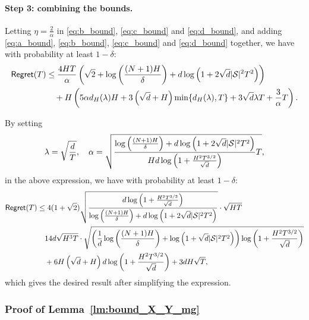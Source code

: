 \paragraph{Step 3: combining the bounds.} Letting $\eta = \frac{2}{\alpha}$ in \eqref{eq:b_bound}, \eqref{eq:c_bound} and \eqref{eq:d_bound}, and adding \eqref{eq:a_bound}, \eqref{eq:b_bound}, \eqref{eq:c_bound} and \eqref{eq:d_bound} together, we have with probability at least $1-\delta$:
\begin{align*}
    \mathsf{Regret}(T)&\leq \frac{4HT}{\alpha}\left(\sqrt{2} + \log\left(\frac{(N+1)H}{\delta}\right) + d\log\left(1+2\sqrt{d}|{\mathcal{S}}|^2T^2\right)\right)\notag\\
    &\quad + H\left(5\alpha d_H(\lambda)H
    + 3\left(\sqrt{d}+H\right) \min\{d_H(\lambda),T\} +3\sqrt{d} \lambda T +\frac{3}{\alpha}T\right).
\end{align*}

By setting
\begin{align}
    \lambda =\sqrt{\frac{d}{T}},\quad \alpha = \sqrt{\frac{\log\left(\frac{(N+1)H}{\delta}\right) + d\log\left(1+2\sqrt{d}|{\mathcal{S}}|^2T^2\right)}{Hd\log\left(1+\frac{H^2T^{3/2}}{\sqrt{d}}\right)}T},
\end{align}
in the above expression, we have with probability at least $1-\delta$:
\begin{align}
    \mathsf{Regret}(T)&\leq 4(1+\sqrt{2})\sqrt{\frac{d\log\left(1+\frac{H^2T^{3/2}}{\sqrt{d}}\right)}{\log\left(\frac{(N+1)H}{\delta}\right) + d\log\left(1+2\sqrt{d}|{\mathcal{S}}|^2T^2\right)}}\cdot \sqrt{HT}\notag\\
    &\quad 14d\sqrt{H^3T}\cdot\sqrt{\left(\frac{1}{d}\log\left(\frac{(N+1)H}{\delta}\right) + \log\left(1+\sqrt{d}|{\mathcal{S}}|^2T^2\right)\right)\log\left(1+\frac{H^2T^{3/2}}{\sqrt{d}}\right)}\notag\\
    &\quad + 6H\left(\sqrt{d}+H\right) d\log\left(1+\frac{H^2T^{3/2}}{\sqrt{d}}\right) +3dH\sqrt{T},
\end{align}
which gives the desired result after simplifying the expression.


\subsubsection{Proof of Lemma~\ref{lm:bound_X_Y_mg}}\label{app:proof_bound_X_Y_mg}

